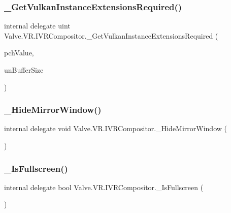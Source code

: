 \subsubsection{\texorpdfstring{\_GetVulkanInstanceExtensionsRequired()}{\_GetVulkanInstanceExtensionsRequired()}}
{\footnotesize\ttfamily internal delegate uint Valve.\+V\+R.\+I\+V\+R\+Compositor.\+\_\+\+Get\+Vulkan\+Instance\+Extensions\+Required (\begin{DoxyParamCaption}\item[{System.\+Text.\+String\+Builder}]{pch\+Value,  }\item[{uint}]{un\+Buffer\+Size }\end{DoxyParamCaption})}

\mbox{\label{struct_valve_1_1_v_r_1_1_i_v_r_compositor_ae7894fcd457855bc576170f3ef45a658}} 
\subsubsection{\texorpdfstring{\_HideMirrorWindow()}{\_HideMirrorWindow()}}
{\footnotesize\ttfamily internal delegate void Valve.\+V\+R.\+I\+V\+R\+Compositor.\+\_\+\+Hide\+Mirror\+Window (\begin{DoxyParamCaption}{ }\end{DoxyParamCaption})}

\mbox{\label{struct_valve_1_1_v_r_1_1_i_v_r_compositor_a860925c25ba19ea99a70ab8b080fc57e}} 
\subsubsection{\texorpdfstring{\_IsFullscreen()}{\_IsFullscreen()}}
{\footnotesize\ttfamily internal delegate bool Valve.\+V\+R.\+I\+V\+R\+Compositor.\+\_\+\+Is\+Fullscreen (\begin{DoxyParamCaption}{ }\end{DoxyParamCaption})}

\mbox{\label{struct_valve_1_1_v_r_1_1_i_v_r_compositor_a709b0f249fd12044c3c24298e0794585}} 
